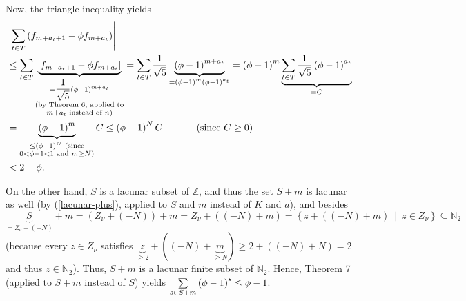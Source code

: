 \documentclass[numbers=enddot,12pt,final,onecolumn,notitlepage]{scrartcl}%
\numberwithin{exer}{section}
\theoremstyle{definition}
\let\sumnonlimits\sum
\renewcommand{\sum}{\sumnonlimits\limits}
\begin{document}
Now, the triangle inequality yields%
\begin{align*}
&  \left\vert \sum\limits_{t\in T}\left(  f_{m+a_{t}+1}-\phi f_{m+a_{t}%
}\right)  \right\vert \\
&  \leq\sum\limits_{t\in T}\underbrace{\left\vert f_{m+a_{t}+1}-\phi
f_{m+a_{t}}\right\vert }_{\substack{=\dfrac{1}{\sqrt{5}}\left(  \phi-1\right)
^{m+a_{t}}\\\text{(by Theorem 6, applied to}\\m+a_{t}\text{ instead of
}n\text{)}}}=\sum\limits_{t\in T}\dfrac{1}{\sqrt{5}}\underbrace{\left(
\phi-1\right)  ^{m+a_{t}}}_{=\left(  \phi-1\right)  ^{m}\left(  \phi-1\right)
^{a_{t}}}=\left(  \phi-1\right)  ^{m}\underbrace{\sum\limits_{t\in T}\dfrac
{1}{\sqrt{5}}\left(  \phi-1\right)  ^{a_{t}}}_{=C}\\
&  =\underbrace{\left(  \phi-1\right)  ^{m}}_{\substack{\leq\left(
\phi-1\right)  ^{N}\text{ (since}\\0<\phi-1<1\text{ and }m\geq N\text{)}%
}}C\leq\left(  \phi-1\right)  ^{N}C\ \ \ \ \ \ \ \ \ \ \left(  \text{since
}C\geq0\right) \\
&  <2-\phi.
\end{align*}


On the other hand, $S$ is a lacunar subset of $\mathbb{Z}$, and thus the set
$S+m$ is lacunar as well (by (\ref{lacunar-plus}), applied to $S$ and $m$
instead of $K$ and $a$), and besides $\underbrace{S}_{=Z_{\nu}+\left(
-N\right)  }+m=\left(  Z_{\nu}+\left(  -N\right)  \right)  +m=Z_{\nu}+\left(
\left(  -N\right)  +m\right)  =\left\{  z+\left(  \left(  -N\right)
+m\right)  \ \mid\ z\in Z_{\nu}\right\}  \subseteq\mathbb{N}_{2}$ (because
every $z\in Z_{\nu}$ satisfies $\underbrace{z}_{\geq2}+\left(  \left(
-N\right)  +\underbrace{m}_{\geq N}\right)  \geq2+\left(  \left(  -N\right)
+N\right)  =2$ and thus $z\in\mathbb{N}_{2}$). Thus, $S+m$ is a lacunar finite
subset of $\mathbb{N}_{2}$. Hence, Theorem 7 (applied to $S+m$ instead of $S$)
yields $\sum\limits_{s\in S+m}\left(  \phi-1\right)  ^{s}\leq\phi-1$.
\end{document}
